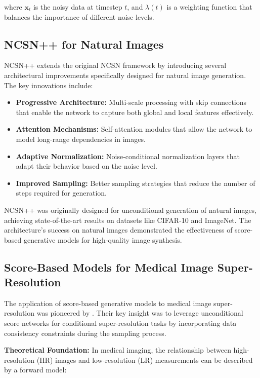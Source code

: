 \documentclass{midl} %
\begin{document}
where $\mathbf{x}_t$ is the noisy data at timestep $t$, and $\lambda(t)$ is a weighting function that balances the importance of different noise levels.

\subsection{NCSN++ for Natural Images}

NCSN++ \citep{song2021score} extends the original NCSN framework by introducing several architectural improvements specifically designed for natural image generation. The key innovations include:

\begin{itemize}
\item \textbf{Progressive Architecture:} Multi-scale processing with skip connections that enable the network to capture both global and local features effectively.
\item \textbf{Attention Mechanisms:} Self-attention modules that allow the network to model long-range dependencies in images.
\item \textbf{Adaptive Normalization:} Noise-conditional normalization layers that adapt their behavior based on the noise level.
\item \textbf{Improved Sampling:} Better sampling strategies that reduce the number of steps required for generation.
\end{itemize}

NCSN++ was originally designed for unconditional generation of natural images, achieving state-of-the-art results on datasets like CIFAR-10 and ImageNet. The architecture's success on natural images demonstrated the effectiveness of score-based generative models for high-quality image synthesis.

\subsection{Score-Based Models for Medical Image Super-Resolution}

The application of score-based generative models to medical image super-resolution was pioneered by \citet{song2021solving}. Their key insight was to leverage unconditional score networks for conditional super-resolution tasks by incorporating data consistency constraints during the sampling process.

\textbf{Theoretical Foundation:} In medical imaging, the relationship between high-resolution (HR) images and low-resolution (LR) measurements can be described by a forward model:
\end{document}
